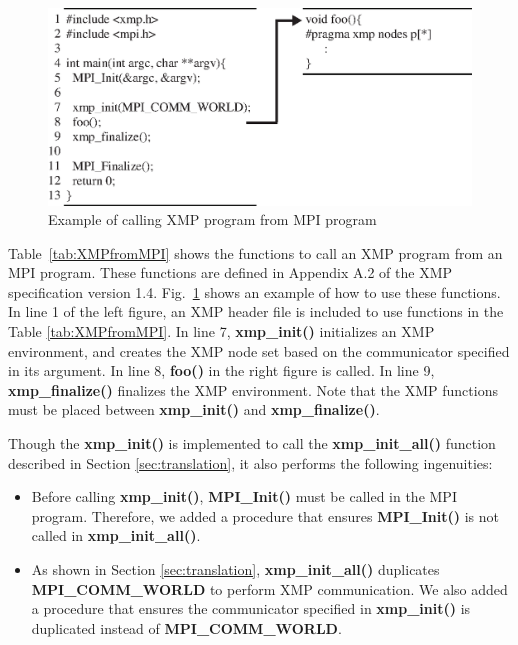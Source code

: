 \documentclass[graybox]{svmult}
\begin{document}
\begin{figure}[h]
\sidecaption
\includegraphics[scale=.82]{img/program2.eps}
\caption{Example of calling XMP program from MPI program\cite{pgas-ei}} \label{fig:program2}
\end{figure}

Table~\ref{tab:XMPfromMPI} shows the functions to call an XMP program from an MPI program.
These functions are defined in Appendix A.2 of the XMP specification version 1.4\cite{xmp-spec}.
Fig.~\ref{fig:program2} shows an example of how to use these functions. 
In line 1 of the left figure,
an XMP header file is included to use functions in the Table \ref{tab:XMPfromMPI}.
In line 7,  {\bf xmp\_init()} initializes an XMP environment,
and creates the XMP node set based on the communicator specified in its argument.
In line 8,
 {\bf foo()}  in the right figure is called.
In line 9,  {\bf xmp\_finalize()} finalizes the XMP environment.
Note that the XMP functions must be placed between  {\bf xmp\_init()} and {\bf xmp\_finalize()}.

Though the {\bf xmp\_init()} is implemented to call the {\bf xmp\_init\_all()} function described in Section \ref{sec:translation},
it also performs the following ingenuities:

\begin{itemize}
\item Before calling {\bf xmp\_init()}, {\bf MPI\_Init()} must be called in the MPI program.
Therefore, we added a procedure that ensures  {\bf MPI\_Init()} is not called in  {\bf xmp\_init\_all()}.
\item As shown in Section \ref{sec:translation},  {\bf xmp\_init\_all()} duplicates {\bf MPI\_COMM\_WORLD} to perform XMP communication.
We also added a procedure that ensures the communicator specified in  {\bf xmp\_init()} is duplicated instead of {\bf MPI\_COMM\_WORLD}.
\end{itemize}
\end{document}
